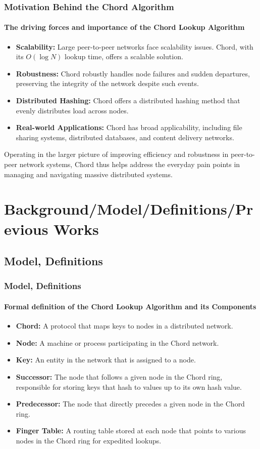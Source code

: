 \documentclass[11pt]{beamer}              %
\begin{document}
\begin{frame}
\frametitle{Motivation Behind the Chord Algorithm}
\framesubtitle{The driving forces and importance of the Chord Lookup Algorithm}

\begin{itemize}
  \item \textbf{Scalability:} Large peer-to-peer networks face scalability issues. Chord, with its $O(\log N)$ lookup time, offers a scalable solution.
  \item \textbf{Robustness:} Chord robustly handles node failures and sudden departures, preserving the integrity of the network despite such events.
  \item \textbf{Distributed Hashing:} Chord offers a distributed hashing method that evenly distributes load across nodes.
  \item \textbf{Real-world Applications:} Chord has broad applicability, including file sharing systems, distributed databases, and content delivery networks.
\end{itemize}

Operating in the larger picture of improving efficiency and robustness in peer-to-peer network systems, Chord thus helps address the everyday pain points in managing and navigating massive distributed systems.

\end{frame}

\section{Background/Model/Definitions/Previous Works}

\subsection{Model, Definitions}

\begin{frame}
\frametitle{Model, Definitions}
\framesubtitle{Formal definition of the Chord Lookup Algorithm and its Components}

\begin{itemize}
\item \textbf{Chord:} A protocol that maps keys to nodes in a distributed network.
\item \textbf{Node:} A machine or process participating in the Chord network.
\item \textbf{Key:} An entity in the network that is assigned to a node.
\item \textbf{Successor:} The node that follows a given node in the Chord ring, responsible for storing keys that hash to values up to its own hash value.
\item \textbf{Predecessor:} The node that directly precedes a given node in the Chord ring.
\item \textbf{Finger Table:} A routing table stored at each node that points to various nodes in the Chord ring for expedited lookups.
\end{itemize}

\end{frame}
\end{document}

